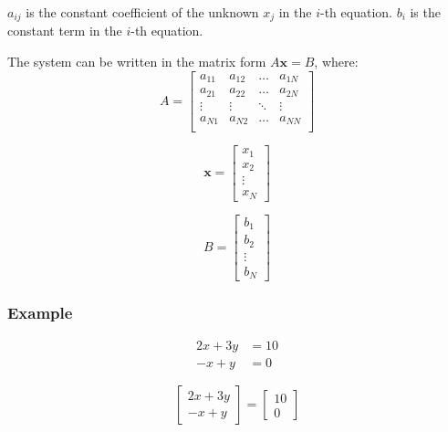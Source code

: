 \documentclass[11pt]{article}
\begin{document}
\(a_{ij}\) is the constant coefficient of the unknown \(x_j\) in the \(i\)-th equation.
\(b_i\) is the constant term in the \(i\)-th equation.

The system can be written in the matrix form \(A \boldsymbol{x} = B\), where:
\begin{displaymath}
A = \begin{bmatrix}
a_{11} & a_{12} & \ldots & a_{1N} \\
a_{21} & a_{22} & \ldots & a_{2N} \\
\vdots & \vdots & \ddots & \vdots \\
a_{N1} & a_{N2} & \ldots & a_{NN} \\
\end{bmatrix}
\end{displaymath}

\begin{displaymath}
\boldsymbol{x} = \begin{bmatrix}
x_1 \\
x_2 \\
\vdots \\
x_N
\end{bmatrix}
\end{displaymath}

\begin{displaymath}
B = \begin{bmatrix}
b_1 \\
b_2 \\
\vdots \\
b_N
\end{bmatrix}
\end{displaymath}

\subsubsection{Example}
\label{sec:org6f3d572}
\begin{align*}
2x + 3y &= 10 \\
-x + y &= 0
\end{align*}

\begin{displaymath}
\begin{bmatrix}
2x + 3y \\
-x + y
\end{bmatrix} = \begin{bmatrix}
10 \\
0
\end{bmatrix}
\end{displaymath}
\end{document}
